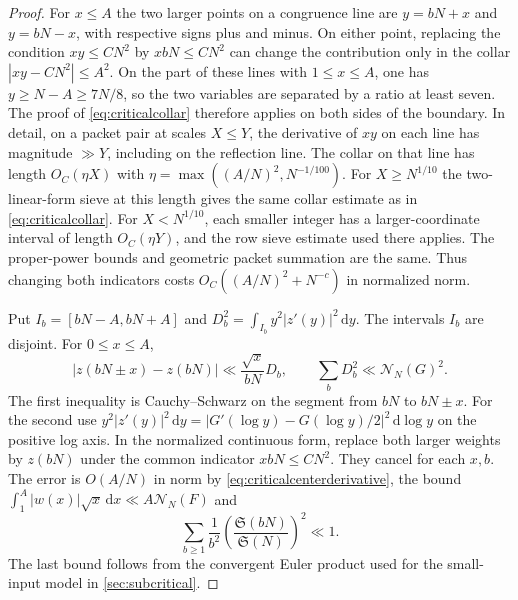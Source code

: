 \documentclass[11pt,a4paper]{article}
\numberwithin{equation}{section}
\newcommand{\SSS}{\mathfrak S}
\newcommand{\ud}{\mathrm d}
\newcommand{\NN}{\mathcal N_N}
\begin{document}
\begin{proof}
For $x\le A$ the two larger points on a congruence line are
$y=bN+x$ and $y=bN-x$, with respective signs plus and minus.
On either point, replacing the condition $xy\le CN^2$ by
$xbN\le CN^2$ can change the contribution only in the collar
$|xy-CN^2|\le A^2$. On the part of these lines with $1\le x\le A$,
one has $y\ge N-A\ge7N/8$, so the two variables are separated
by a ratio at least seven. The proof of \cref{eq:criticalcollar}
therefore applies on both sides of the boundary. In detail,
on a packet pair at scales $X\le Y$, the derivative of $xy$
on each line has magnitude $\gg Y$, including on the
reflection line. The collar on that line has length
$O_C(\eta X)$ with $\eta=\max((A/N)^2,N^{-1/100})$.
For $X\ge N^{1/10}$ the two-linear-form sieve at this length
gives the same collar estimate as in \cref{eq:criticalcollar}.
For $X<N^{1/10}$, each smaller integer has a larger-coordinate
interval of length $O_C(\eta Y)$, and the row sieve estimate
used there applies. The proper-power bounds and geometric
packet summation are the same. Thus changing both indicators
costs $O_C((A/N)^2+N^{-c})$ in normalized norm.

Put $I_b=[bN-A,bN+A]$ and
$D_b^2=\int_{I_b}y^2|z'(y)|^2\,\ud y$.
The intervals $I_b$ are disjoint. For $0\le x\le A$,
\begin{equation}
 |z(bN\pm x)-z(bN)|\ll\frac{\sqrt{x}}{bN}D_b,\qquad
 \sum_b D_b^2\ll\NN(G)^2 .
 \label{eq:criticalcenterderivative}
\end{equation}
The first inequality is Cauchy--Schwarz on the segment
from $bN$ to $bN\pm x$. For the second use
$y^2|z'(y)|^2\,\ud y=|G'(\log y)-G(\log y)/2|^2\,\ud\log y$
on the positive log axis. In the normalized continuous form,
replace both larger weights by $z(bN)$ under the common
indicator $xbN\le CN^2$. They cancel for each $x,b$.
The error is $O(A/N)$ in norm by
\cref{eq:criticalcenterderivative}, the bound
$\int_1^A |w(x)|\sqrt{x}\,\ud x\ll A\NN(F)$ and
\[
 \sum_{b\ge1}\frac{1}{b^2}
           \left(\frac{\SSS(bN)}{\SSS(N)}\right)^2\ll1.
\]
The last bound follows from the convergent Euler product
used for the small-input model in \cref{sec:subcritical}.


\end{proof}
\end{document}
